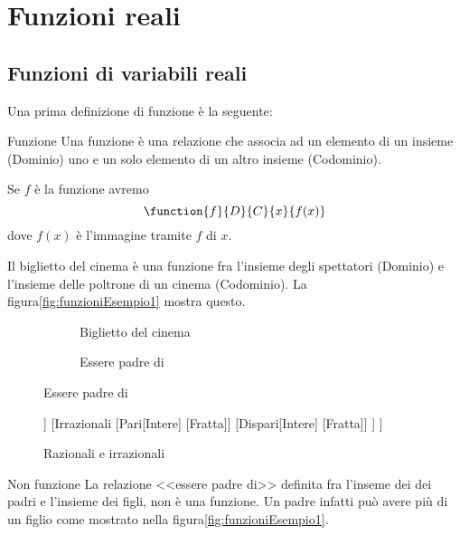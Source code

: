 \chapter{Funzioni reali}
\label{cha:FunzioniEquazioniEsponenziali}
\section{Funzioni di variabili reali}
\label{sec:FunzioniVariabileReale}
Una prima definizione di funzione è la seguente:
\begin{definizionet}{Funzione}{}
Una funzione è una relazione che associa ad un elemento di un insieme (Dominio) uno e un solo elemento di un altro insieme (Codominio). 
\end{definizionet}
Se $f$ è la funzione avremo \[\function{f}{D}{C}{x}{f(x)}\]
dove $f(x)$ è l'immagine tramite $f$ di $x$.
\begin{osservazionet}{}{}
 Il biglietto del cinema è una funzione fra l'insieme degli spettatori (Dominio) e l'insieme delle poltrone di un cinema (Codominio). La figura\nobs\vref{fig:funzioniEsempio1} mostra questo. 
 \end{osservazionet}
\begin{figure}
	\centering
	\begin{subfigure}[b]{.4\linewidth}
		\centering
		
		\caption{Biglietto del cinema}
		\label{fig:funzioniEsempio1}
	\end{subfigure}\qquad
	\centering
		\begin{subfigure}[b]{.4\linewidth}
			\centering
			
			\caption{Essere padre di}
			\label{fig:funzioniEsempio2}
		\end{subfigure}%
\end{figure}
\begin{figure}
	\centering
	\begin{forest}
		[Funzioni[Razionali
		[Intere]
		[Fratta]]
		[Irrazionali
		[Pari[Intere]
		[Fratta]]
		[Dispari[Intere]
		[Fratta]]
		]
		]
	\end{forest}
	\caption{Razionali e irrazionali}
	\label{FunzioniRazionaliIrrazionali}
\end{figure}
\begin{osservazionet}{Non funzione}{}
La relazione <<essere padre di>> definita fra l'inseme dei dei padri e l'insieme dei figli, non è una funzione. Un padre infatti può avere più di un figlio come mostrato nella  figura\nobs\vref{fig:funzioniEsempio1}.
\end{osservazionet}
